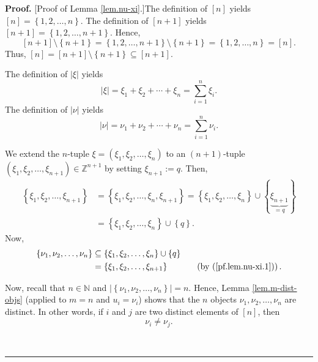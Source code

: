 \documentclass[numbers=enddot,12pt,final,onecolumn,notitlepage,english]{scrartcl}%
\theoremstyle{definition}
\newenvironment{proof}[1][Proof]{\noindent\textbf{#1.} }{\ \rule{0.5em}{0.5em}}
\let\sumnonlimits\sum
\renewcommand{\sum}{\sumnonlimits\limits}
\newenvironment{verlong}{}{}
\begin{document}
\begin{verlong}
\begin{proof}
[Proof of Lemma \ref{lem.nu-xi}.]The definition of $\left[  n\right]  $ yields
$\left[  n\right]  =\left\{  1,2,\ldots,n\right\}  $. The definition of
$\left[  n+1\right]  $ yields $\left[  n+1\right]  =\left\{  1,2,\ldots
,n+1\right\}  $. Hence,%
\[
\left[  n+1\right]  \setminus\left\{  n+1\right\}  =\left\{  1,2,\ldots
,n+1\right\}  \setminus\left\{  n+1\right\}  =\left\{  1,2,\ldots,n\right\}
=\left[  n\right]  .
\]
Thus, $\left[  n\right]  =\left[  n+1\right]  \setminus\left\{  n+1\right\}
\subseteq\left[  n+1\right]  $.

The definition of $\left\vert \xi\right\vert $ yields
\begin{equation}
\left\vert \xi\right\vert =\xi_{1}+\xi_{2}+\cdots+\xi_{n}=\sum_{i=1}^{n}%
\xi_{i}. \label{pf.lem.nu-xi.sum-xi}%
\end{equation}
The definition of $\left\vert \nu\right\vert $ yields
\begin{equation}
\left\vert \nu\right\vert =\nu_{1}+\nu_{2}+\cdots+\nu_{n}=\sum_{i=1}^{n}%
\nu_{i}. \label{pf.lem.nu-xi.sum-nu}%
\end{equation}


We extend the $n$-tuple $\xi=\left(  \xi_{1},\xi_{2},\ldots,\xi_{n}\right)  $
to an $\left(  n+1\right)  $-tuple $\left(  \xi_{1},\xi_{2},\ldots,\xi
_{n+1}\right)  \in\mathbb{Z}^{n+1}$ by setting $\xi_{n+1}:=q$. Then,%
\begin{align}
\left\{  \xi_{1},\xi_{2},\ldots,\xi_{n+1}\right\}   &  =\left\{  \xi_{1}%
,\xi_{2},\ldots,\xi_{n},\xi_{n+1}\right\}  =\left\{  \xi_{1},\xi_{2}%
,\ldots,\xi_{n}\right\}  \cup\left\{  \underbrace{\xi_{n+1}}_{=q}\right\}
\nonumber\\
&  =\left\{  \xi_{1},\xi_{2},\ldots,\xi_{n}\right\}  \cup\left\{  q\right\}  .
\label{pf.lem.nu-xi.1}%
\end{align}
Now,
\begin{align}
\left\{  \nu_{1},\nu_{2},\ldots,\nu_{n}\right\}   &  \subseteq\left\{  \xi
_{1},\xi_{2},\ldots,\xi_{n}\right\}  \cup\left\{  q\right\} \nonumber\\
&  =\left\{  \xi_{1},\xi_{2},\ldots,\xi_{n+1}\right\}
\ \ \ \ \ \ \ \ \ \ \left(  \text{by (\ref{pf.lem.nu-xi.1})}\right)  .
\label{pf.lem.nu-xi.2}%
\end{align}


Now, recall that $n\in\mathbb{N}$ and $\left\vert \left\{  \nu_{1},\nu
_{2},\ldots,\nu_{n}\right\}  \right\vert =n$. Hence, Lemma
\ref{lem.m-dist-objs} (applied to $m=n$ and $u_{i}=\nu_{i}$) shows that the
$n$ objects $\nu_{1},\nu_{2},\ldots,\nu_{n}$ are distinct. In other words, if
$i$ and $j$ are two distinct elements of $\left[  n\right]  $, then%
\begin{equation}
\nu_{i}\neq\nu_{j}. \label{pf.lem.nu-xi.xipneqetaq}%
\end{equation}



\end{proof}
\end{verlong}
\end{document}
